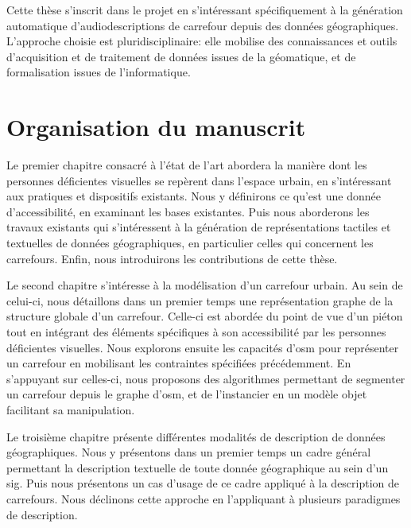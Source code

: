 
\newpar{}

Cette thèse s'inscrit dans le projet en s'intéressant spécifiquement à la génération automatique d'audiodescriptions de carrefour depuis des données géographiques. L'approche choisie est pluridisciplinaire: elle mobilise des connaissances et outils d'acquisition et de traitement de données issues de la géomatique, et de formalisation issues de l'informatique.

\section*{Organisation du manuscrit}

Le premier chapitre consacré à l'état de l'art abordera la manière dont les personnes déficientes visuelles se repèrent dans l'espace urbain, en s'intéressant aux pratiques et dispositifs existants. Nous y définirons ce qu'est une donnée d'accessibilité, en examinant les bases existantes. Puis nous aborderons les travaux existants qui s'intéressent à la génération de représentations tactiles et textuelles de données géographiques, en particulier celles qui concernent les carrefours. Enfin, nous introduirons les contributions de cette thèse.

\newpar{}

Le second chapitre s'intéresse à la modélisation d'un carrefour urbain. Au sein de celui-ci, nous détaillons dans un premier temps une représentation graphe de la structure globale d'un carrefour. Celle-ci est abordée du point de vue d'un piéton tout en intégrant des éléments spécifiques à son accessibilité par les personnes déficientes visuelles. Nous explorons ensuite les capacités d'\gls{osm} pour représenter un carrefour en mobilisant les contraintes spécifiées précédemment. En s'appuyant sur celles-ci, nous proposons des algorithmes permettant de segmenter un carrefour depuis le graphe d'\gls{osm}, et de l'instancier en un modèle objet facilitant sa manipulation.

\newpar{}

Le troisième chapitre présente différentes modalités de description de données géographiques. Nous y présentons dans un premier temps un cadre général permettant la description textuelle de toute donnée géographique au sein d'un \gls{sig}. Puis nous présentons un cas d'usage de ce cadre appliqué à la description de carrefours. Nous déclinons cette approche en l'appliquant à plusieurs paradigmes de description.

